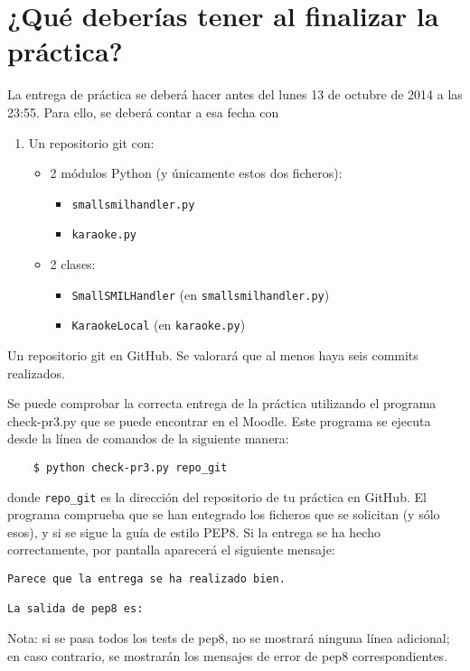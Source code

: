 \documentclass[11pt,a4paper]{article}
\begin{document}
\section{¿Qué deberías tener al finalizar la práctica?}

La entrega de práctica se deberá hacer antes del lunes 13 de octubre de 2014 a las 23:55. Para ello, se deberá contar a esa fecha con

\begin{enumerate}
  \item Un repositorio git con:
  \begin{itemize}
    \item 2 módulos Python (y únicamente estos dos ficheros):
    \begin{itemize}
      \item \texttt{smallsmilhandler.py}
      \item \texttt{karaoke.py}
    \end{itemize}
    \item 2 clases:
    \begin{itemize}
      \item \texttt{SmallSMILHandler} (en \texttt{smallsmilhandler.py})
      \item \texttt{KaraokeLocal} (en \texttt{karaoke.py})
    \end{itemize}
  \end{itemize}
\end{enumerate}

Un repositorio git en GitHub. Se valorará que al menos haya seis commits realizados.

Se puede comprobar la correcta entrega de la práctica utilizando el programa check-pr3.py que se puede encontrar en el Moodle. Este programa se ejecuta desde la línea de comandos de la siguiente manera:
\begin{verbatim}
	$ python check-pr3.py repo_git
\end{verbatim}

donde \texttt{repo\_git} es la dirección del repositorio de tu práctica en GitHub. El programa comprueba que se han entegrado los ficheros que se solicitan (y sólo esos), y si se sigue la guía de estilo PEP8. Si la entrega se ha hecho correctamente, por pantalla aparecerá el siguiente mensaje:

\begin{verbatim}
Parece que la entrega se ha realizado bien. 

La salida de pep8 es:
\end{verbatim}

Nota: si se pasa todos los tests de pep8, no se mostrará ninguna línea adicional; en caso contrario, se mostrarán los mensajes de error de pep8 correspondientes.
\end{document}
